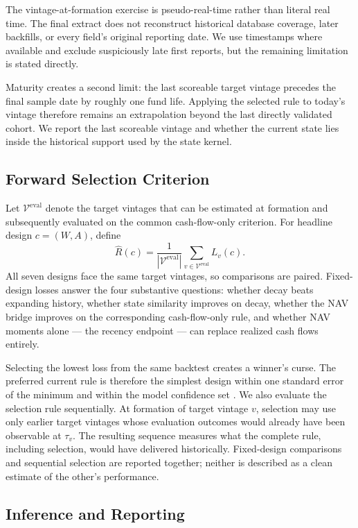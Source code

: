 \documentclass[11pt]{article}
\begin{document}
The vintage-at-formation exercise is pseudo-real-time rather than literal
real time. The final extract does not reconstruct historical database
coverage, later backfills, or every field's original reporting date. We use
timestamps where available and exclude suspiciously late first reports, but
the remaining limitation is stated directly.

Maturity creates a second limit: the last scoreable target vintage precedes
the final sample date by roughly one fund life. Applying the selected rule to
today's vintage therefore remains an extrapolation beyond the last directly
validated cohort. We report the last scoreable vintage and whether the current
state lies inside the historical support used by the state kernel.

\subsection{Forward Selection Criterion}
\label{sec:forward}

Let $\mathcal V^{\mathrm{eval}}$ denote the target vintages that can be
estimated at formation and subsequently evaluated on the common cash-flow-only
criterion. For headline design $c=(W,A)$, define
\[
\widehat R(c)
=
\frac{1}{|\mathcal V^{\mathrm{eval}}|}
\sum_{v\in\mathcal V^{\mathrm{eval}}}L_v(c).
\]
All seven designs face the same target vintages, so comparisons are paired.
Fixed-design losses answer the four substantive questions: whether decay
beats expanding history, whether state similarity improves on decay, whether
the NAV bridge improves on the corresponding cash-flow-only rule, and whether
NAV moments alone --- the recency endpoint --- can replace realized cash
flows entirely.

Selecting the lowest loss from the same backtest creates a winner's curse.
The preferred current rule is therefore the simplest design within one
standard error of the minimum and within the model confidence set
\citep{HansenLundeNason2011}. We also evaluate the selection rule sequentially.
At formation of target vintage $v$, selection may use only earlier target
vintages whose evaluation outcomes would already have been observable at
$\tau_v$. The resulting sequence measures what the complete rule, including
selection, would have delivered historically. Fixed-design comparisons and
sequential selection are reported together; neither is described as a clean
estimate of the other's performance.

\subsection{Inference and Reporting}
\end{document}
